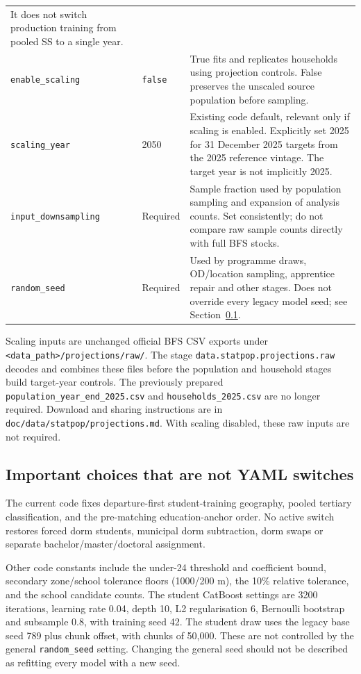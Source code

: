 \documentclass[11pt,a4paper]{article}
\newcommand{\code}[1]{\nolinkurl{#1}}
\begin{document}
\begin{longtable}{L{.34\textwidth}L{.13\textwidth}L{.45\textwidth}}
It does not switch production training from pooled SS to a single year. \\
\code{enable_scaling} & \code{false} & True fits and replicates households using
projection controls. False preserves the unscaled source population before sampling. \\
\code{scaling_year} & 2050 & Existing code default, relevant only if scaling is
enabled. Explicitly set 2025 for 31 December 2025 targets from the 2025 reference
vintage. The target year is not implicitly 2025. \\
\code{input_downsampling} & Required & Sample fraction used by population
sampling and expansion of analysis counts. Set consistently; do not compare
raw sample counts directly with full BFS stocks. \\
\code{random_seed} & Required & Used by programme draws, OD/location sampling,
apprentice repair and other stages. Does not override every legacy model seed;
see Section~\ref{sec:constants}. \\
\bottomrule
\end{longtable}
\normalsize

Scaling inputs are unchanged official BFS CSV exports under
\code{<data_path>/projections/raw/}. The stage
\code{data.statpop.projections.raw} decodes and combines these files before the
population and household stages build target-year controls. The previously
prepared \code{population_year_end_2025.csv} and \code{households_2025.csv} are
no longer required. Download and sharing instructions are in
\code{doc/data/statpop/projections.md}. With scaling disabled, these raw inputs
are not required.

\subsection{Important choices that are not YAML switches}
\label{sec:constants}

The current code fixes departure-first student-training geography, pooled
tertiary classification, and the pre-matching education-anchor order. No active
switch restores forced dorm students, municipal dorm subtraction, dorm swaps
or separate bachelor/master/doctoral assignment.

Other code constants include the under-24 threshold and coefficient bound,
secondary zone/school tolerance floors (1000/200 m), the 10\% relative tolerance,
and the school candidate counts. The student CatBoost settings are 3200
iterations, learning rate 0.04, depth 10, L2 regularisation 6, Bernoulli
bootstrap and subsample 0.8, with training seed 42. The student draw uses the
legacy base seed 789 plus chunk offset, with chunks of 50,000. These are not
controlled by the general \code{random_seed} setting. Changing the general
seed should not be described as refitting every model with a new seed.
\end{document}
